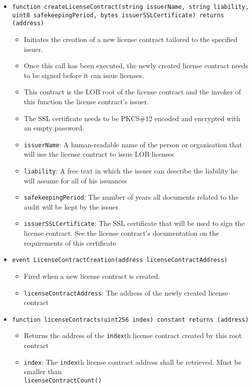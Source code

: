 \documentclass[a4paper]{article}
\begin{document}
\begin{itemize}
  \item \texttt{function createLicenseContract(string issuerName, string liability, \\uint8 safekeepingPeriod, bytes issuerSSLCertificate) returns (address)}
  \begin{itemize}
    \item Initiates the creation of a new license contract tailored to the specified issuer. 
    \item Once this call has been executed, the newly created license contract needs to be signed before it can issue licenses.
    \item This contract is the LOB root of the license contract and the invoker of this function the license contract's issuer.
    \item The SSL certificate needs to be PKCS\#12 encoded and encrypted with an empty password.
    \item \texttt{issuerName}: A human-readable name of the person or organisation that will use the license contract to issue LOB licenses
    \item \texttt{liability}: A free text in which the issuer can describe the liability he will assume for all of his issuances
    \item \texttt{safekeepingPeriod}: The number of years all documents related to the audit will be kept by the issuer
    \item \texttt{issuerSSLCertificate}: The SSL certificate that will be used to sign the license contract. See the license contract's documentation on the requirements of this certificate
  \end{itemize}
    
  \item \texttt{event LicenseContractCreation(address licenseContractAddress)}
  \begin{itemize}
    \item Fired when a new license contract is created.
    \item \texttt{licenseContractAddress}: The address of the newly created license contract
  \end{itemize}
  
  \item \texttt{function licenseContracts(uint256 index) constant returns (address)}
  \begin{itemize}
    \item Returns the address of the \texttt{index}th license contract created by this root contract
    \item \texttt{index}: The \texttt{index}th license contract address shall be retrieved. Must be smaller than \\\texttt{licenseContractCount()}
  \end{itemize}


\end{itemize}
\end{document}
